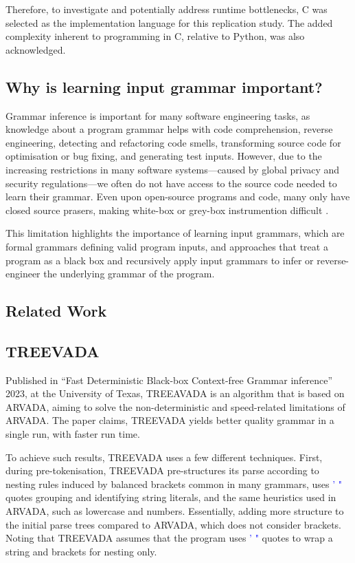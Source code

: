 Therefore, to investigate and potentially address runtime bottlenecks, C was selected as the implementation language for this replication study. The added complexity inherent to programming in C, relative to Python, was also acknowledged.


\subsection{Why is learning input grammar important?}
Grammar inference is important for many software engineering tasks, as knowledge about a program grammar helps with code comprehension, reverse engineering, detecting and refactoring code smells, transforming source code for optimisation or bug fixing, and generating test inputs\cite{arefinFastDeterministicBlackbox2024}. However, due to the increasing restrictions in many software systems—caused by global privacy and security regulations—we often do not have access to the source code needed to learn their grammar.  Even upon open-source programs and code, many only have closed source prasers, making white-box or grey-box instrumention difficult \cite{arefinFastDeterministicBlackbox2024,liIncrementalContextfreeGrammar2024}.

\vspace{\baselineskip}
This limitation highlights the importance of learning input grammars, which are formal grammars defining valid program inputs, and approaches that treat a program as a black box and recursively apply input grammars to infer or reverse-engineer the underlying grammar of the program.


\subsection{Related Work}

\subsection{TREEVADA}

Published in \enquote{Fast Deterministic Black-box Context-free Grammar inference} 2023, at the University of Texas\cite{arefinFastDeterministicBlackbox2024}, TREEAVADA is an algorithm that is based on ARVADA\cite{kulkarniLearningHighlyRecursive2021}, aiming to solve the non-deterministic and speed-related limitations of ARVADA. The paper claims, TREEVADA yields better quality grammar in a single run, with faster run time.

\vspace{\baselineskip}
To achieve such results, TREEVADA uses a few different techniques. First, during pre-tokenisation, TREEVADA pre-structures its parse according to nesting rules induced by balanced brackets common in many grammars, uses \textcolor{blue}{' "} quotes grouping and identifying string literals, and the same heuristics used in ARVADA, such as lowercase and numbers. Essentially, adding more structure to the initial parse trees compared to ARVADA, which does not consider brackets. Noting that TREEVADA assumes that the program uses \textcolor{blue}{' "} quotes to wrap a string and brackets for nesting only.

